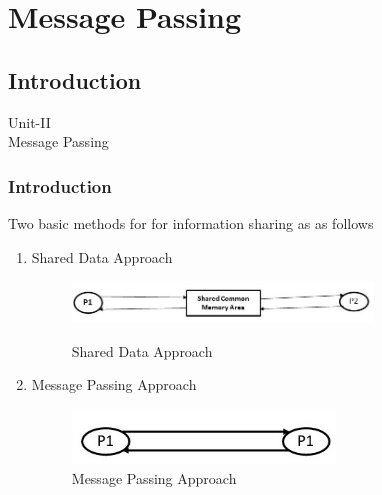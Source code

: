 \documentclass{beamer}
\author[Govt. Colleg of Engg, Jalgaon]{}
\begin{document}
\section{Message Passing}

\subsection{Introduction}
\begin{frame}
	\centering
	\large Unit-II\\
	\huge Message Passing\\
	
\end{frame}


\begin{frame}
	\frametitle{Introduction}
		Two basic methods for for information sharing as as follows
		\begin{enumerate}
		\item Shared Data Approach\\
		\begin{figure}
			\centering
			\includegraphics[width=8cm]{sharedDataApproach.jpg}\\
			\caption{Shared Data Approach}
		\end{figure}
		\item Message Passing Approach\\
		\begin{figure}
			\centering
			\includegraphics[width=7cm]{messagePassingApproach.jpg}
			\caption{Message Passing Approach}
		\end{figure}
		\end{enumerate}
\end{frame}
\end{document}
